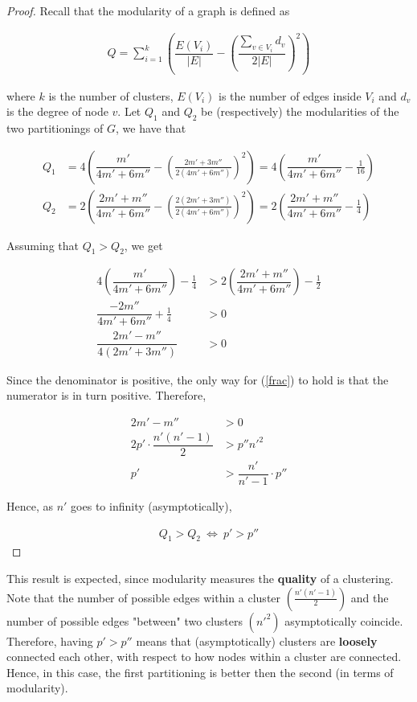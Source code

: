\begin{proof}
	Recall that the modularity\cite{mod} of a graph is defined as
	
	\begin{align*}
		Q = \sum_{i = 1}^{k} \left( \dfrac{E(V_i)}{|E|} - \left( \dfrac{\sum_{v \in V_i} d_v}{2|E|} \right)^2 \right) 
	\end{align*}
	
	\medskip
	\noindent where $k$ is the number of clusters, $E(V_i)$ is the number of edges inside $V_i$ and $d_v$ is the degree of node $v$. Let $Q_1$ and $Q_2$ be  (respectively) the modularities of the two partitionings of $G$, we have that
	
	\begin{align*}
		Q_1 &= 4 \left( \dfrac{m'}{4m' + 6m''} - \left( \frac{2m' + 3m''}{2(4m' + 6m'')} \right)^2 \right) = 4 \left( \dfrac{m'}{4m' + 6m''} - \frac{1}{16} \right)\\
		Q_2 &= 2 \left( \dfrac{2m' + m''}{4m' + 6m''} - \left( \frac{2(2m' + 3m'')}{2(4m' + 6m'')} \right)^2 \right) = 2 \left( \dfrac{2m' + m''}{4m' + 6m''} - \frac{1}{4} \right) 
	\end{align*}
	
	\medskip
	\noindent Assuming that $Q_1 > Q_2$, we get
	
	\begin{align}
		4 \left( \dfrac{m'}{4m' + 6m''} \right) - \frac{1}{4} &> 2 \left( \dfrac{2m' + m''}{4m' + 6m''} \right) - \frac{1}{2} \nonumber\\ 
		\dfrac{- 2m''}{4m' + 6m''} + \frac{1}{4} &> 0 \nonumber\\ 
		\dfrac{2m' - m''}{4(2m' + 3m'')} &> 0 \label{frac}
	\end{align}
	
	\medskip
	\noindent Since the denominator is positive, the only way for (\ref{frac}) to hold is that the numerator is in turn positive. Therefore,
	
	\begin{align*}
		2m' - m'' &> 0\\
		2p' \cdot \dfrac{n'(n'-1)}{2} &> p''n'^2\\
		p' &> \dfrac{n'}{n'-1} \cdot p''
	\end{align*}
	
	\medskip
	\noindent Hence, as $n'$ goes to infinity (asymptotically),
	
	\begin{align*}
		Q_1 > Q_2 \ \Leftrightarrow \ p' > p''
	\end{align*}
\end{proof}

\medskip
\noindent This result is expected, since modularity measures the \textbf{quality} of a clustering.\\
Note that the number of possible edges within a cluster $\left( \frac{n'(n'-1)}{2} \right)$ and the number of possible edges "between" two clusters $\left( n'^2 \right)$ asymptotically coincide. Therefore, having $p' > p''$ means that (asymptotically) clusters are \textbf{loosely} connected each other, with respect to how nodes within a cluster are connected. Hence, in this case, the first partitioning is better then the second (in terms of modularity).
